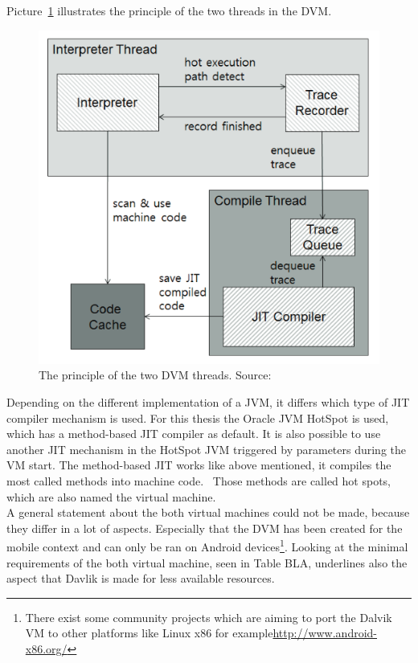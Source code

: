 Picture~\ref{fig:dvm-threads} illustrates the principle of the two threads in the DVM.\\
\begin{figure}[h]
\begin{center}
\includegraphics[scale=0.5]{images/dvm-threads.png} 
\caption{The principle of the two DVM threads. Source:\cite{oh2012evaluation}}
\label{fig:dvm-threads}
\end{center}
\end{figure}

Depending on the different implementation of a JVM, it differs which type of JIT compiler mechanism is used.
For this thesis the Oracle JVM HotSpot is used, which has a method-based JIT compiler as default.
It is also possible to use another JIT mechanism in the HotSpot JVM triggered by parameters during the VM start.
The method-based JIT works like above mentioned, it compiles the most called methods into machine code.~\cite{kotzmann2008design}
Those methods are called hot spots, which are also named the virtual machine.
\cite{paleczny2001java}
\\
A general statement about the both virtual machines could not be made, because they differ in a lot of aspects.
Especially that the DVM has been created for the mobile context and can only be ran on Android devices\footnote{There exist some community projects which are aiming to port the Dalvik VM to other platforms like Linux x86 for example\url{http://www.android-x86.org/}}.
Looking at the minimal requirements of the both virtual machine, seen in Table BLA, underlines also the aspect that Davlik is made for less available resources.



